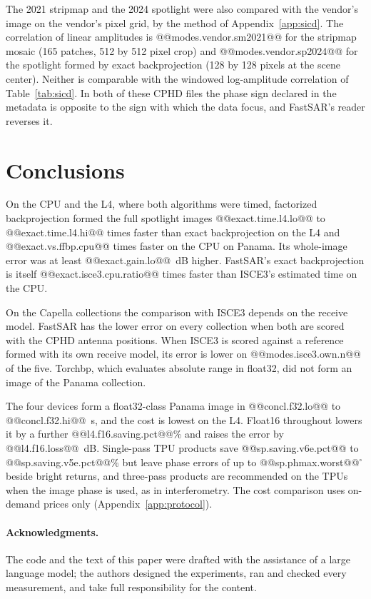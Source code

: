\documentclass[11pt]{article}
\begin{document}
The 2021 stripmap and the 2024 spotlight were also compared with the vendor's image on the vendor's pixel grid, by the method of Appendix~\ref{app:sicd}. The correlation of linear amplitudes is @@modes.vendor.sm2021@@ for the stripmap mosaic (165 patches, 512 by 512 pixel crop) and @@modes.vendor.sp2024@@ for the spotlight formed by exact backprojection (128 by 128 pixels at the scene center). Neither is comparable with the windowed log-amplitude correlation of Table~\ref{tab:sicd}. In both of these CPHD files the phase sign declared in the metadata is opposite to the sign with which the data focus, and FastSAR's reader reverses it.



\section{Conclusions}
\label{sec:concl}

On the CPU and the L4, where both algorithms were timed, factorized backprojection formed the full spotlight images @@exact.time.l4.lo@@ to @@exact.time.l4.hi@@ times faster than exact backprojection on the L4 and @@exact.vs.ffbp.cpu@@ times faster on the CPU on Panama. Its whole-image error was at least @@exact.gain.lo@@~dB higher. FastSAR's exact backprojection is itself @@exact.isce3.cpu.ratio@@ times faster than ISCE3's estimated time on the CPU.

On the Capella collections the comparison with ISCE3 depends on the receive model. FastSAR has the lower error on every collection when both are scored with the CPHD antenna positions. When ISCE3 is scored against a reference formed with its own receive model, its error is lower on @@modes.isce3.own.n@@ of the five. Torchbp, which evaluates absolute range in float32, did not form an image of the Panama collection.

The four devices form a float32-class Panama image in @@concl.f32.lo@@ to @@concl.f32.hi@@~s, and the cost is lowest on the L4. Float16 throughout lowers it by a further @@l4.f16.saving.pct@@\% and raises the error by @@l4.f16.loss@@~dB. Single-pass TPU products save @@sp.saving.v6e.pct@@ to @@sp.saving.v5e.pct@@\% but leave phase errors of up to @@sp.phmax.worst@@$^\circ$ beside bright returns, and three-pass products are recommended on the TPUs when the image phase is used, as in interferometry. The cost comparison uses on-demand prices only (Appendix~\ref{app:protocol}).

\paragraph{Acknowledgments.} The code and the text of this paper were drafted with the assistance of a large language model; the authors designed the experiments, ran and checked every measurement, and take full responsibility for the content.
\end{document}
